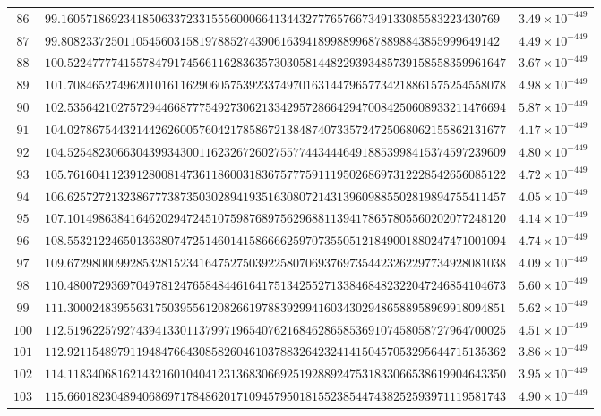 \documentclass[12pt,reqno]{amsart}
\theoremstyle{remark}
\begin{document}
\begin{longtable}{clc}
$86$ & $99.1605718692341850633723315556000664134432777657667349133085583223430769$ & $3.49\times 10^{-449}$ \\
$87$ & $99.8082337250110545603158197885274390616394189988996878898843855999649142$ & $4.49\times 10^{-449}$ \\
$88$ & $100.5224777741557847917456611628363573030581448229393485739158558359961647$ & $3.67\times 10^{-449}$ \\
$89$ & $101.7084652749620101611629060575392337497016314479657734218861575254558078$ & $4.98\times 10^{-449}$ \\
$90$ & $102.5356421027572944668777549273062133429572866429470084250608933211476694$ & $5.87\times 10^{-449}$ \\
$91$ & $104.0278675443214426260057604217858672138487407335724725068062155862131677$ & $4.17\times 10^{-449}$ \\
$92$ & $104.5254823066304399343001162326726027557744344464918853998415374597239609$ & $4.80\times 10^{-449}$ \\
$93$ & $105.7616041123912800814736118600318367577759111950268697312228542656085122$ & $4.72\times 10^{-449}$ \\
$94$ & $106.6257272132386777387350302894193516308072143139609885502819894755411457$ & $4.05\times 10^{-449}$ \\
$95$ & $107.1014986384164620294724510759876897562968811394178657805560202077248120$ & $4.14\times 10^{-449}$ \\
$96$ & $108.5532122465013638074725146014158666625970735505121849001880247471001094$ & $4.74\times 10^{-449}$ \\
$97$ & $109.6729800099285328152341647527503922580706937697354423262297734928081038$ & $4.09\times 10^{-449}$ \\
$98$ & $110.4800729369704978124765848446164175134255271338468482322047246854104673$ & $5.60\times 10^{-449}$ \\
$99$ & $111.3000248395563175039556120826619788392994160343029486588958969918094851$ & $5.62\times 10^{-449}$ \\
$100$ & $112.5196225792743941330113799719654076216846286585369107458058727964700025$ & $4.51\times 10^{-449}$ \\
$101$ & $112.9211548979119484766430858260461037883264232414150457053295644715135362$ & $3.86\times 10^{-449}$ \\
$102$ & $114.1183406816214321601040412313683066925192889247531833066538619904643350$ & $3.95\times 10^{-449}$ \\
$103$ & $115.6601823048940686971784862017109457950181552385447438252593971119581743$ & $4.90\times 10^{-449}$ \\

\end{longtable}
\end{document}
